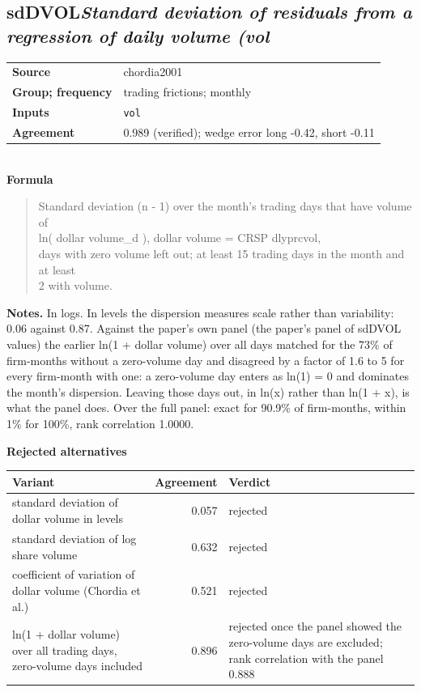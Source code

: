 \documentclass[11pt]{article}
\begin{document}
\subsection*{sdDVOL\quad\normalfont\itshape Standard deviation of residuals from a regression of daily volume (vol}
\begin{tabular}{@{}p{3.3cm}p{12.3cm}@{}}
\textbf{Source} & chordia2001\\
\textbf{Group; frequency} & trading frictions; monthly\\
\textbf{Inputs} & \texttt{vol}\\
\textbf{Agreement} & 0.989 (verified); wedge error long -0.42, short -0.11\\
\end{tabular}\\[4pt]
\textbf{Formula}
\begin{quote}\small
Standard deviation (n - 1) over the month's trading days that have volume of\\
    ln( dollar volume\_d ),   dollar volume = CRSP dlyprcvol,\\
days with zero volume left out; at least 15 trading days in the month and at least\\
2 with volume.\\

\end{quote}
\textbf{Notes.} In logs. In levels the dispersion measures scale rather than variability: 0.06 against 0.87. Against the paper's own panel (the paper's panel of sdDVOL values) the earlier ln(1 + dollar volume) over all days matched for the 73\% of firm-months without a zero-volume day and disagreed by a factor of 1.6 to 5 for every firm-month with one: a zero-volume day enters as ln(1) = 0 and dominates the month's dispersion. Leaving those days out, in ln(x) rather than ln(1 + x), is what the panel does. Over the full panel: exact for 90.9\% of firm-months, within 1\% for 100\%, rank correlation 1.0000.

\textbf{Rejected alternatives}\\[2pt]
{\small\begin{longtable}{@{}p{9.6cm}rp{4.3cm}@{}}
\toprule Variant & Agreement & Verdict\\\midrule\endhead
standard deviation of dollar volume in levels & 0.057 & rejected\\
standard deviation of log share volume & 0.632 & rejected\\
coefficient of variation of dollar volume (Chordia et al.) & 0.521 & rejected\\
ln(1 + dollar volume) over all trading days, zero-volume days included & 0.896 & rejected once the panel showed the zero-volume days are excluded; rank correlation with the panel 0.888\\
\bottomrule\end{longtable}}
\end{document}
